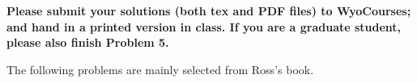 \documentclass{report}
\begin{document}

\fancyhead{}
\fancyfoot{}



\newcommand{\N}{\mathbb{N}}
\newcommand{\Z}{\mathbb{Z}}
\newcommand{\Q}{\mathbb{Q}}
\newcommand{\R}{\mathbb{R}}
\newcommand{\C}{\mathbb{C}}
\newcommand{\D}{\mathbb{D}}
\newcommand{\<}{\left\langle}
\renewcommand{\>}{\right\rangle}
\renewcommand{\Re}[1]{\text{Re}\ #1}
\renewcommand{\Im}[1]{\text{Im}\ #1}
\renewcommand{\mod}[1]{(\operatorname{mod}#1)}



\noindent
{\bf Please submit your solutions (both tex and PDF files) to WyoCourses; and hand in a printed version in class. If you are a graduate student, please also finish Problem 5.}

\medskip


The following problems are mainly selected from Ross's book. 
\end{document}
